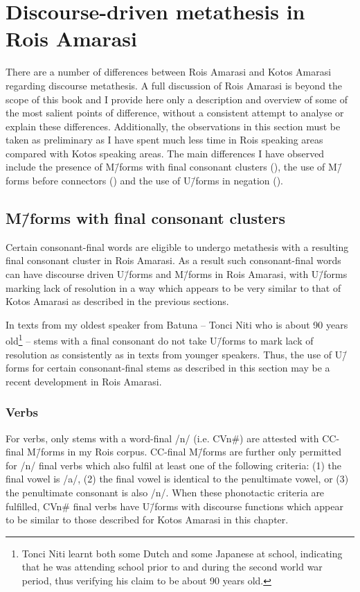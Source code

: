 \section{Discourse-driven metathesis in Ro{\Q}is Amarasi}\label{sec:DisDriMetRoqAma}
There are a number of differences between Ro{\Q}is Amarasi
and Kotos Amarasi regarding discourse metathesis.
A full discussion of Ro{\Q}is Amarasi is beyond the scope of this book
and I provide here only a description and 
overview of some of the most salient points of difference,
without a consistent attempt to analyse or explain these differences.
Additionally, the observations in this section must be taken
as preliminary as I have spent much less time in Ro{\Q}is
speaking areas compared with Kotos speaking areas.
The main differences I have observed include the presence of M\=/forms with final
consonant clusters (), the use of M\=/forms before
connectors () and the use of U\=/forms in negation ().

\subsection{M\=/forms with final consonant clusters}\label{sec:MforFinConClu}
Certain consonant-final words are eligible
to undergo metathesis with a resulting
final consonant cluster in Ro{\Q}is Amarasi.
As a result such consonant-final words can have discourse
driven U\=/forms and M\=/forms in Ro{\Q}is Amarasi,
with U\=/forms marking lack of resolution
in a way which appears to be very similar to that of Kotos Amarasi
as described in the previous sections.

In texts from my oldest speaker from Batuna
-- Tonci Niti who is about 90 years old\footnote{
		Tonci Niti learnt both some Dutch and some
		Japanese at school, indicating that he was attending
		school prior to and during the second world war period,
		thus verifying his claim to be about 90 years old.} --
stems with a final consonant do not take U\=/forms
to mark lack of resolution as consistently
as in texts from younger speakers.
Thus, the use of U\=/forms for certain
consonant-final stems as described in this section 
may be a recent development in Ro{\Q}is Amarasi.

\subsubsection{Verbs}
For verbs, only stems with a word-final /n/ (i.e. CVn{\#})
are attested with CC-final M\=/forms in my Ro{\Q}is corpus.
CC-final M\=/forms are further only permitted for
/n/ final verbs which also fulfil at least one of the following
criteria: (1) the final vowel is /a/,
(2) the final vowel is identical to the penultimate vowel,
or (3) the penultimate consonant is also /n/.
When these phonotactic criteria are fulfilled,
CVn{\#} final verbs have U\=/forms
with discourse functions which appear to be similar
to those described for Kotos Amarasi in this chapter. 

